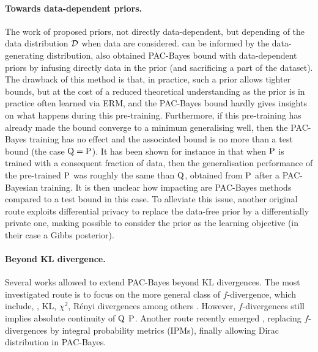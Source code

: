 \paragraph{Towards data-dependent priors.} The work of \citep{catoni2007pac,lever2010distribution,lever2013tighter} proposed priors, not directly data-dependent, but depending of the data distribution $\Dcal$ when \iid data are considered. can be informed by the
data-generating distribution, \citet{parradohernandez2012pac,oneto2016pac,dziugaite2017computing,mhammedi2019pac} also obtained PAC-Bayes bound with data-dependent priors by infusing directly data in the prior (and sacrificing a part of the dataset). The drawback of this method is that, in practice, such a prior allows tighter bounds, but at the cost of a reduced theoretical understanding as the prior is in practice often learned via ERM, and the PAC-Bayes bound hardly gives insights on what happens during this pre-training. Furthermore, if this pre-training has already made the bound converge to a minimum generalising well, then the PAC-Bayes training has no effect and the associated bound is no more than a test bound (the case $\Q=\P$). It has been shown for instance in \citep{perezortiz2021learning} that when $\P$ is trained with a consequent fraction of data, then the generalisation performance of the pre-trained $\P$ was roughly the same than $\Q$, obtained from $\P$ after a PAC-Bayesian training. It is then unclear how impacting are PAC-Bayes methods compared to a test bound in this case. To alleviate this issue, another original route \citep{dziugaite2018data} exploits differential privacy to replace the data-free prior by a differentially private one, making possible to consider the prior as the learning objective (in their case a Gibbs posterior).

\paragraph{Beyond KL divergence.} Several works allowed to extend PAC-Bayes beyond KL divergences. The most investigated route is to focus on the more general class of $f$-divergence, which include, \eg, KL, $\chi^2$, Rényi divergences among others \citep{alquier2018simpler,ohnishi2021novel,picard2022change,viallard2023general}. However, $f$-divergences still implies absolute continuity of $\Q$ \wrt $\P$. Another route recently emerged \citep{amit2022integral}, replacing $f$-divergences by integral probability metrics (IPMs), finally allowing Dirac distribution in PAC-Bayes.


